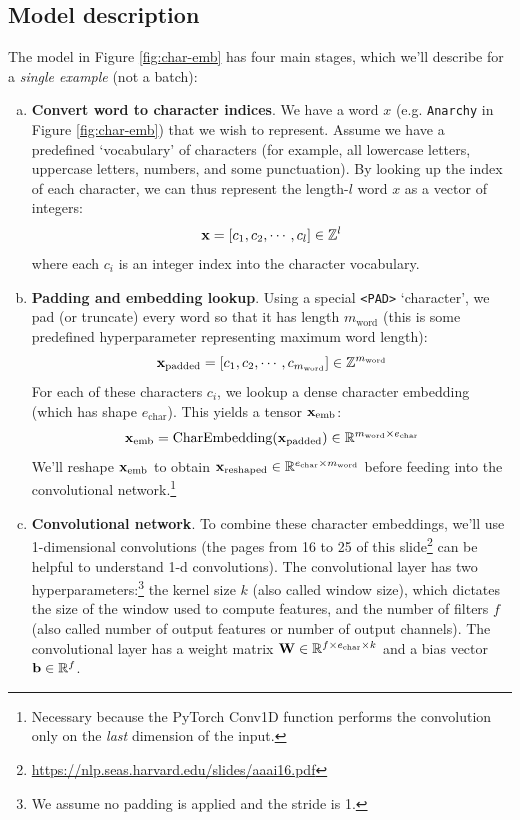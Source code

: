 \subsection*{Model description}
The model in Figure \ref{fig:char-emb} has four main stages, which we'll describe for a \textit{single example} (not a batch):
\begin{enumerate}[(a)]
    \item \textbf{Convert word to character indices}.
    We have a word $x$ (e.g. \texttt{Anarchy} in Figure \ref{fig:char-emb}) that we wish to represent. 
    Assume we have a predefined `vocabulary' of characters (for example, all lowercase letters, uppercase letters, numbers, and some punctuation).
    By looking up the index of each character, we can thus represent the length-$l$ word $x$ as a vector of integers:
    \begin{equation}
        \mathbf{x} = [c_1, c_2, \cdots, c_{l}] \in \mathbb{Z}^l
    \end{equation}
    where each $c_i$ is an integer index into the character vocabulary. 

    \item \textbf{Padding and embedding lookup}.
    Using a special \texttt{<PAD>} `character', 
    we pad (or truncate) every word so that it has length $m_\text{word}$ (this is some predefined hyperparameter representing maximum word length):
    \begin{equation}
        \mathbf{x}_{\text{padded}} = [c_1, c_2, \cdots, c_{m_{\text{word}}}] \in \mathbb{Z}^{m_\text{word}}
    \end{equation}
    For each of these characters $c_i$, we lookup a dense character embedding (which has shape $e_\text{char}$). This yields a tensor $\mathbf{x}_\text{emb}$:
    \begin{equation}
        \mathbf{x}_\text{emb} = \text{CharEmbedding}(\mathbf{x}_{\text{padded}}) \in \mathbb{R}^{m_{\text{word}}\times e_\text{char}}    
    \end{equation}
    We'll reshape $\mathbf{x}_\text{emb}$ to obtain $\mathbf{x}_{\text{reshaped}} \in \mathbb{R}^{e_\text{char} \times m_\text{word}}$ before feeding into the convolutional network.\footnote{Necessary because the PyTorch Conv1D function performs the convolution only on the \textit{last} dimension of the input.}
    \item \textbf{Convolutional network}.
        To combine these character embeddings, we'll use 1-dimensional convolutions (the pages from 16 to 25 of this slide\footnote{\url{https://nlp.seas.harvard.edu/slides/aaai16.pdf}} can be helpful to understand 1-d convolutions). The convolutional layer has two hyperparameters:\footnote{We assume no padding is applied and the stride is 1.} the kernel size $k$ (also called window size), which dictates the size of the window used to compute features, and the number of filters $f$ (also called number of output features or number of output channels). 
    The convolutional layer has a weight matrix $\mathbf{W} \in \mathbb{R}^{f \times e_\text{char} \times k}$ and a bias vector $\mathbf{b} \in \mathbb{R}^f$.
    \newline
    

\end{enumerate}

